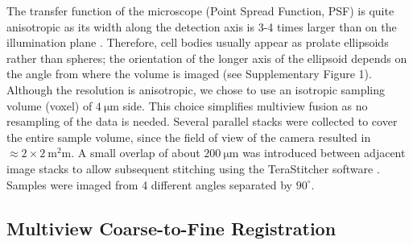 \documentclass[smallextended]{svjour3}       %
\begin{document}
The transfer function of the microscope (Point Spread Function, PSF) is quite anisotropic as its width
along the detection axis is 3-4 times larger than on the illumination plane \cite{silvestri_confocal_2012}. Therefore,
cell bodies usually appear as prolate ellipsoids rather than spheres; the orientation of the longer axis of the ellipsoid
depends on the angle from where the volume is imaged (see Supplementary Figure 1).
Although the resolution is anisotropic, we chose to use an isotropic sampling volume (voxel) of $\SI{4}{\micro\meter}$ side.
This choice simplifies multiview fusion as no resampling of the data is needed.
Several parallel stacks were
collected to cover the entire sample volume, since the field of view of the camera resulted in
$\approx 2 \times \SI{2}{\square\milli\meter}$. A small overlap of about $\SI{200}{\micro\meter}$ was introduced
between adjacent image stacks to allow subsequent stitching using the TeraStitcher software
\cite{bria_terastitcher-tool_2011}. Samples were imaged from 4 different angles separated by $90^\circ$.





\subsection{Multiview Coarse-to-Fine Registration}
\label{sec:registration}
\end{document}
